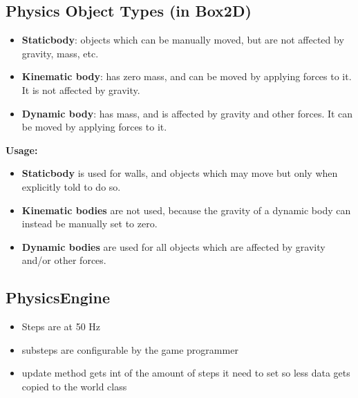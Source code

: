 \subsection{Physics Object Types (in Box2D)}
\begin{itemize}
    \item \textbf{Staticbody}: objects which can be manually moved, but are not affected by gravity, mass, etc.
    \item \textbf{Kinematic body}: has zero mass, and can be moved by applying forces to it. It is not affected by gravity.
    \item \textbf{Dynamic body}: has mass, and is affected by gravity and other forces. It can be moved by applying forces to it.
\end{itemize}

\noindent
\textbf{Usage:}
\begin{itemize}
    \item \textbf{Staticbody} is used for walls, and objects which may move but only when explicitly told to do so.
    \item \textbf{Kinematic bodies} are not used, because the gravity of a dynamic body can instead be manually set to zero.
    \item \textbf{Dynamic bodies} are used for all objects which are affected by gravity and/or other forces.
\end{itemize}

\subsection{PhysicsEngine}{
  \begin{itemize}
      \item Steps are at 50 Hz
      \item substeps are configurable by the game programmer
      \item update method gets int of the amount of steps it need to set so less data gets copied to the world class
  \end{itemize}
 }